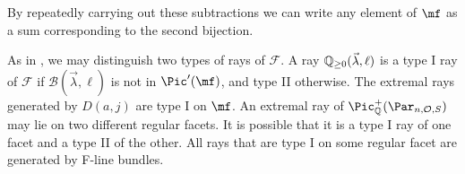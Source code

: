 By repeatedly carrying out these subtractions we can write any element of  $\mf$ as a sum corresponding to the second bijection.
\begin{remark}
\notready
As in \cite{BHermit,BKiers,Kiers}, we may distinguish two types of rays of $\mathcal{F}$. A ray
$\Bbb{Q}_{\geq 0}(\vec{\lambda},\ell)$ is a type I ray of $\mathcal{F}$ if $\mathcal{B}(\vec{\lambda},\ell)$ is not in $\Pic'(\mf)$, and type II otherwise. The extremal rays  generated by $D(a,j)$  are  type I on $\mf$. An extremal ray of  $\Pic^+_{\Bbb{Q}}(\Par_{n,\mathcal{O},S})$ may lie on two different regular facets. It is possible that it is a type I ray of one facet and a type II of the other. All rays that are type I on some regular facet are generated by F-line bundles.
\end{remark}
